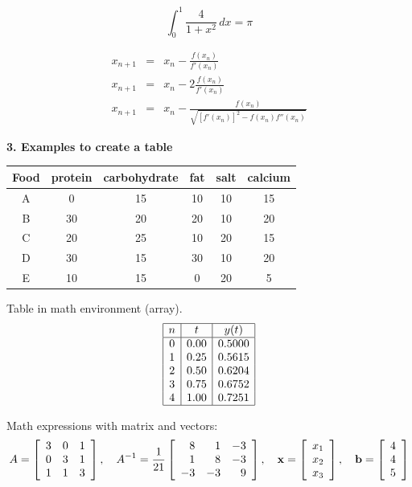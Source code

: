 \documentclass[12pt]{article}
\begin{document}
\begin{equation*}
\int_0^1 \frac{4}{1+x^2}\, dx = \pi
\end{equation*} 



\begin{eqnarray*}
x_{n+1} &= & x_n-\frac{f(x_n)}{f'(x_n)}\\
x_{n+1} &=& x_n-2\frac{f(x_n)}{f'(x_n)}\\
x_{n+1} &=& x_n-\frac{f(x_n)}{\sqrt{[f'(x_n)]^2-f(x_n)f''(x_n)}}
\end{eqnarray*}

\newpage
\noindent \textbf{3. Examples to create a table} 

\begin{center}
\begin{tabular}{|c|c|c|c|c|c|}
\hline
Food  &  protein & carbohydrate & fat & salt & calcium\\
\hline
	 A	&   0    &     15 	&       10 		&    10 &    15\\
	 B	&  30    &    20   	&     	20   & 10   &  20\\
	 C	&  20    &    25    &    	10   & 20  &   15\\
	 D	&  30    &   15     &  		30    & 10 &    20\\
	 E	&  10    &  15       & 		0    & 20 &     5\\
\hline
\end{tabular}
\end{center}
\vspace{0.1in}

Table in math environment (array). 
\[
\begin{array}{|c|c|c|}
\hline
n & t & y(t)\\
\hline
0 & 0.00 & 0.5000\\
1 & 0.25 & 0.5615\\
2 & 0.50 & 0.6204\\
3 & 0.75 & 0.6752\\
4 & 1.00 & 0.7251\\
\hline
\end{array}
\]

Math expressions with matrix and vectors:
\[
A=
\left[
\begin{array}{rrr}
3&0&1\\
0&3&1\\
1&1&3
\end{array}
\right]
,\quad
A^{-1}= \frac{1}{21}\left[\begin{array}{rrr}
8 & 1 & -3 \\
1 & 8 & -3\\
-3 & -3 & 9
\end{array}\right], \quad
{\bf x}=
\left[
\begin{array}{r}
x_1\\
x_2\\
x_3
\end{array}
\right], \quad
{\bf b}=
\left[
\begin{array}{r}
4\\
4\\
5
\end{array}
\right]
\]
\end{document}
